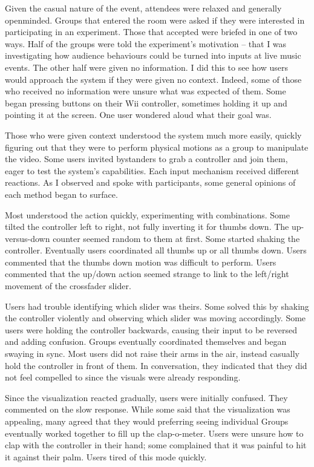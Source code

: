 Given the casual nature of the event, attendees were relaxed and generally openminded. Groups that entered the room were asked if they were interested in participating in an experiment. Those that accepted were briefed in one of two ways. Half of the groups were told the experiment's motivation -- that I was investigating how audience behaviours could be turned into inputs at live music events. The other half were given no information. I did this to see how users would approach the system if they were given no context. Indeed, some of those who received no information were unsure what was expected of them. Some began pressing buttons on their Wii controller, sometimes holding it up and pointing it at the screen. One user wondered aloud what their goal was.

Those who were given context understood the system much more easily, quickly figuring out that they were to perform physical motions as a group to manipulate the video. Some users invited bystanders to grab a controller and join them, eager to test the system's capabilities. Each input mechanism received different reactions. As I observed and spoke with participants, some general opinions of each method began to surface.

Most understood the action quickly, experimenting with combinations. Some tilted the controller left to right, not fully inverting it for thumbs down. The up-versus-down counter seemed random to them at first. Some started shaking the controller. Eventually users coordinated all thumbs up or all thumbs down. Users commented that the thumbs down motion was difficult to perform. Users commented that the up/down action seemed strange to link to the left/right movement of the crossfader slider.

Users had trouble identifying which slider was theirs. Some solved this by shaking the controller violently and observing which slider was moving accordingly. Some users were holding the controller backwards, causing their input to be reversed and adding confusion. Groups eventually coordinated themselves and began swaying in sync. Most users did not raise their arms in the air, instead casually hold the controller in front of them. In conversation, they indicated that they did not feel compelled to since the visuals were already responding. 

Since the visualization reacted gradually, users were initially confused. They commented on the slow response. While some said that the visualization was appealing, many agreed that they would preferring seeing individual  Groups eventually worked together to fill up the clap-o-meter. Users were unsure how to clap with the controller in their hand; some complained that it was painful to hit it against their palm. Users tired of this mode quickly.

